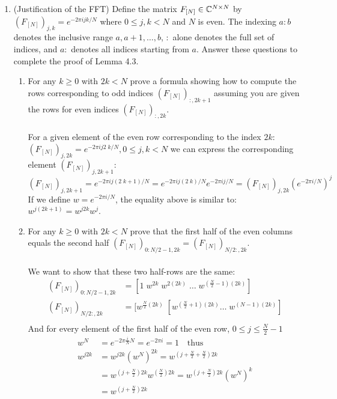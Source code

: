 \documentclass[12pt,twoside]{article}
\begin{document}
\begin{enumerate}
\begin{enumerate}
  \end{enumerate}

\newpage
\item (Justification of the FFT) Define the matrix
  $F_{[N]}\in\mathbb{C}^{N\times N}$ by
  $(F_{[N]})_{j,k}=e^{-2\pi i jk/N}$ where $0\leq j,k<N$ and $N$ is even.
  The indexing $a:b$ denotes the
  inclusive range $a,a+1,\ldots,b$, $:$ alone denotes the
  full set of indices, and $a:$ denotes all indices starting from $a$. Answer these questions to complete the proof of Lemma 4.3.
  \begin{enumerate}
  \item For any $k\geq 0$ with $2k<N$ prove a formula showing how to
    compute the rows corresponding to odd indices $(F_{[N]})_{:,2k+1}$ assuming you are given the rows for even indices $(F_{[N]})_{:,2k}$.\\ \\
    For a given element of the even row corresponding to the index $2k$: $(F_{[N]})_{j,2k}=e^{-2\pi i j 2\; k/N}, 0\leq j,k<N$ we can express the corresponding
    element $(F_{[N]})_{j,2k+1}$:
    $$
    	(F_{[N]})_{j,2k+1}=e^{-2\pi i j (2\; k + 1)/N} = e^{-2\pi i j (2\; k)/N} e^{-2\pi i j/N}  = (F_{[N]})_{j,2k} (e^{-2\pi i /N})^j
    $$
    If we define $w = e^{-2\pi i /N}$, the equality above is similar to: $w^{j (2k + 1)} = w^{j 2k} w^j$.
    
  \item For any $k\geq 0$ with $2k<N$ prove that the first half of the even columns equals the second half $(F_{[N]})_{0:N/2-1,2k}=(F_{[N]})_{N/2:,2k}$.  \\ \\
  We want to show that these two half-rows are the same:
  \begin{align*}
  	(F_{[N]})_{0:N/2-1,2k}	&= [1 \; w^{2k} \; w^{2 (2k)} \; \ldots \; w^{(\frac{N}{2} -1) (2k)} ] \\
  	(F_{[N]})_{N/2:,2k}		&= [w^{\frac{N}{2} (2k)}  \; [w^{(\frac{N}{2} + 1) (2k)}  \ldots \; w^{(N -1) (2k)} ] \\
  \end{align*}
  And for every element of the first half of the even row, $0 \le j \le \frac{N}{2}-1$
  \begin{align*}
  	w^N		&=	 e^{-2\pi \frac{i}{N} N} = e^{-2\pi i} = 1 \text{ ~ thus }\\ 	
  	w^{j 2k} 	&=	w^{j 2k} (w^N)^{2k} = w^{ (j +  \frac{N}{2} +  \frac{N}{2}) 2k} \\
			&= 	w^{ (j +  \frac{N}{2}) 2k} w^{(\frac{N}{2}) 2k} = w^{ (j +  \frac{N}{2}) 2k} (w^N)^k\\
			&= 	 w^{ (j +  \frac{N}{2}) 2k}
  \end{align*}
    

\end{enumerate}
\end{enumerate}
\end{document}
